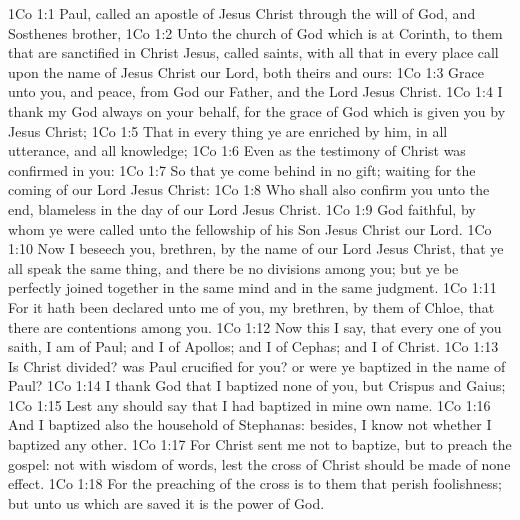 \vs 1Co 1:1 Paul, called  an apostle of Jesus Christ through the will of God, and Sosthenes  brother,
\vs 1Co 1:2 Unto the church of God which is at Corinth, to them that are sanctified in Christ Jesus, called  saints, with all that in every place call upon the name of Jesus Christ our Lord, both theirs and ours:
\vs 1Co 1:3 Grace  unto you, and peace, from God our Father, and  the Lord Jesus Christ.
\vs 1Co 1:4 I thank my God always on your behalf, for the grace of God which is given you by Jesus Christ;
\vs 1Co 1:5 That in every thing ye are enriched by him, in all utterance, and  all knowledge;
\vs 1Co 1:6 Even as the testimony of Christ was confirmed in you:
\vs 1Co 1:7 So that ye come behind in no gift; waiting for the coming of our Lord Jesus Christ:
\vs 1Co 1:8 Who shall also confirm you unto the end,  blameless in the day of our Lord Jesus Christ.
\vs 1Co 1:9 God  faithful, by whom ye were called unto the fellowship of his Son Jesus Christ our Lord.
\vs 1Co 1:10 Now I beseech you, brethren, by the name of our Lord Jesus Christ, that ye all speak the same thing, and  there be no divisions among you; but  ye be perfectly joined together in the same mind and in the same judgment.
\vs 1Co 1:11 For it hath been declared unto me of you, my brethren, by them  of Chloe, that there are contentions among you.
\vs 1Co 1:12 Now this I say, that every one of you saith, I am of Paul; and I of Apollos; and I of Cephas; and I of Christ.
\vs 1Co 1:13 Is Christ divided? was Paul crucified for you? or were ye baptized in the name of Paul?
\vs 1Co 1:14 I thank God that I baptized none of you, but Crispus and Gaius;
\vs 1Co 1:15 Lest any should say that I had baptized in mine own name.
\vs 1Co 1:16 And I baptized also the household of Stephanas: besides, I know not whether I baptized any other.
\vs 1Co 1:17 For Christ sent me not to baptize, but to preach the gospel: not with wisdom of words, lest the cross of Christ should be made of none effect.
\vs 1Co 1:18 For the preaching of the cross is to them that perish foolishness; but unto us which are saved it is the power of God.
